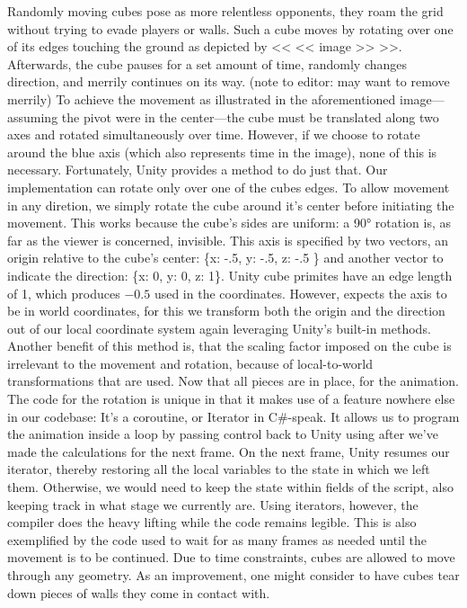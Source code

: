 \documentclass{report}
\begin{document}
Randomly moving cubes pose as more relentless opponents, they roam the grid without trying to evade players or walls. Such a cube moves by rotating over one of its edges touching the ground as depicted by << << image >> >>. Afterwards, the cube pauses for a set amount of time, randomly changes direction, and merrily continues on its way. (note to editor: may want to remove merrily) To achieve the movement as illustrated in the aforementioned image---assuming the pivot were in the center---the cube must be translated along two axes and rotated simultaneously over time. However, if we choose to rotate around the blue axis (which also represents time in the image), none of this is necessary. Fortunately, Unity provides a  method to do just that.
Our implementation can rotate only over one of the cubes edges. To allow movement in any diretion, we simply rotate the cube around it's center before initiating the movement. This works because the cube's sides are uniform: a 90° rotation is, as far as the viewer is concerned, invisible. This axis is specified by two vectors, an origin relative to the cube's center: \{x: -.5, y: -.5, z: -.5 \} and another vector to indicate the direction: \{x: 0, y: 0, z: 1\}. Unity cube primites have an edge length of 1, which produces $-0.5$ used in the coordinates. However,  expects the axis to be in world coordinates, for this we transform both the origin and the direction out of our local coordinate system again leveraging Unity's built-in methods. Another benefit of this method is, that the scaling factor imposed on the cube is irrelevant to the movement and rotation, because of local-to-world transformations that are used.
Now that all pieces are in place, for the animation.
The code for the rotation is unique in that it makes use of a feature nowhere else in our codebase: It's a coroutine, or Iterator in C#-speak\cite{http://msdn.microsoft.com/en-us/library/dscyy5s0.aspx}. It allows us to program the animation inside a loop by passing control back to Unity using  after we've made the calculations for the next frame. On the next frame, Unity resumes our iterator, thereby restoring all the local variables to the state in which we left them. Otherwise, we would need to keep the state within fields of the script, also keeping track in what stage we currently are. Using iterators, however, the compiler does the heavy lifting while the code remains legible. This is also exemplified by the code used to wait for as many frames as needed until the movement is to be continued.
Due to time constraints, cubes are allowed to move through any geometry. As an improvement, one might consider to have cubes tear down pieces of walls they come in contact with.
\end{document}
